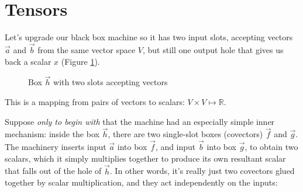 \section{Tensors}

Let's upgrade our black box machine so it has two input slots, accepting vectors $\vec{a}$ and $\vec{b}$ from the same vector space $V$, but still one output hole that gives us back a scalar $x$ (Figure \ref{fig:2-slot-box}).

\begin{figure}[h]
    \centering
    \caption{Box $\vec{h}$ with two slots accepting vectors} \label{fig:2-slot-box}
\end{figure}

This is a mapping from pairs of vectors to scalars: $V \times V \mapsto \mathbb{R}$.

Suppose \textit{only to begin with} that the machine had an especially simple inner mechanism: inside the box $\vec{h}$, there are two single-slot boxes (covectors) $\vec{f}$ and $\vec{g}$. The machinery inserts input $\vec{a}$ into box $\vec{f}$, and input $\vec{b}$ into box $\vec{g}$, to obtain two scalars, which it simply multiplies together to produce its own resultant scalar that falls out of the hole of $\vec{h}$. In other words, it's really just two covectors glued together by scalar multiplication, and they act independently on the inputs:

